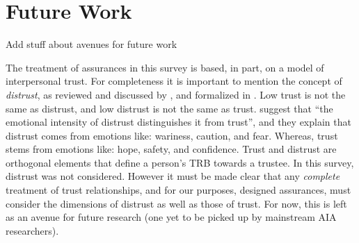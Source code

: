 \section{Future Work} \label{sec:future_work}
Add stuff about avenues for future work

The treatment of assurances in this survey is based, in part, on a model of interpersonal trust. For completeness it is important to mention the concept of \textit{distrust}, as reviewed and discussed by \citet{Lewicki1998-ox}, and formalized in \citet{McKnight2001-gz}. Low trust is not the same as distrust, and low distrust is not the same as trust. \citet{McKnight2001-gz} suggest that ``the emotional intensity of distrust distinguishes it from trust'', and they explain that distrust comes from emotions like: wariness, caution, and fear. Whereas, trust stems from emotions like: hope, safety, and confidence. Trust and distrust are orthogonal elements that define a person's TRB towards a trustee. In this survey, distrust was not considered. However it must be made clear that any \emph{complete} treatment of trust relationships, and for our purposes, designed assurances, must consider the dimensions of distrust as well as those of trust. For now, this is left as an avenue for future research (one yet to be picked up by mainstream AIA researchers).
